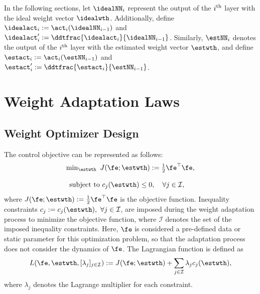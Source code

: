 \documentclass[journal]{IEEEtran}
\begin{document}
In the following sections, let $\idealNN_i$ represent the output of the $i\textsuperscript{th}$ layer with the ideal weight vector $\idealwth$. 
Additionally, define $\idealact_i:=\act_i(\idealNN_{i-1})$ and ${\idealact}'_i:= \ddtfrac{\idealact_i}{\idealNN_{i-1}}$. 
Similarly, $\estNN_i$ denotes the output of the $i\textsuperscript{th}$ layer with the estimated weight vector $\estwth$, and define $\estact_i:=\act_i(\estNN_{i-1})$ and $\estact_i':= \ddtfrac{\estact_i}{\estNN_{i-1}}$.

\section{Weight Adaptation Laws}\label{sec:adap_laws}

\subsection{Weight Optimizer Design}\label{sec:sub:weight optimizer}

The control objective can be represented as follows:
\begin{equation}
    \begin{matrix}
        \min_{\estwth} \ J(\fe;\estwth):= 
        \tfrac{1}{2} \fe^\top \fe
        ,
        \\ \\
        \begin{aligned}
        \text{subject to }&c_{j}(\estwth) 
        \le0, \quad \forall j\in\mathcal{I},
        \end{aligned}
    \end{matrix}
    \label{eq:opt:problem1}
\end{equation}
where $J(\fe;\estwth):= \tfrac{1}{2} \fe^\top \fe$ is the objective function.
Inequality constraints $c_j:=c_j(\estwth),\ \forall j\in\mathcal{I}$, are imposed during the weight adaptation process to minimize the objective function, where $\mathcal I$ denotes the set of the imposed inequality constraints. 
Here, $\fe$ is considered a pre-defined data or static parameter for this optimization problem, so that the adaptation process does not consider the dynamics of $\fe$.
The Lagrangian function is defined as
\begin{equation}
    L(
        \fe,\estwth,[\lambda_j]_{j\in\mathcal I}
    ) 
    := 
    J(\fe;\estwth) 
    + 
    \sum_{j\in\mathcal I}
    \lambda_{j}
    c_{j}(\estwth)
    ,
    \label{eq:lagrangian}
\end{equation}
where $\lambda_j$ denotes the Lagrange multiplier for each constraint.
\end{document}
